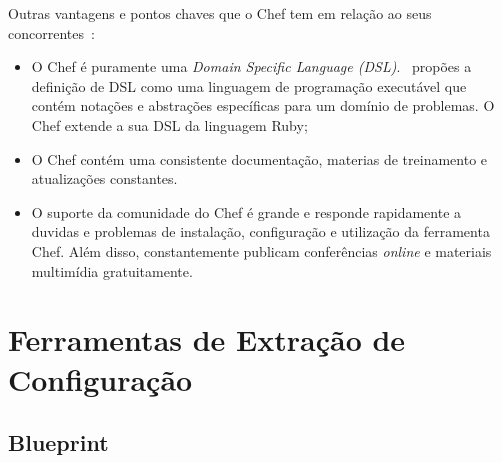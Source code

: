 Outras vantagens e pontos chaves que o Chef tem em relação ao seus
concorrentes~\cite{sharma:2015}:
\begin{itemize}
  \item O Chef é puramente uma \textit{Domain Specific Language (DSL)}.~
    propões a definição de DSL como uma linguagem de programação executável que
    contém notações e abstrações específicas para um domínio de problemas. O Chef
    extende a sua DSL da linguagem Ruby;
  \item O Chef contém uma consistente documentação, materias de treinamento e
    atualizações constantes.
  \item O suporte da comunidade do Chef é grande e responde rapidamente a duvidas
    e problemas de instalação, configuração e utilização da ferramenta Chef.
    Além disso, constantemente publicam conferências \textit{online} e materiais multimídia
    gratuitamente.
\end{itemize}

\section{Ferramentas de Extração de Configuração}

\subsection{Blueprint}



